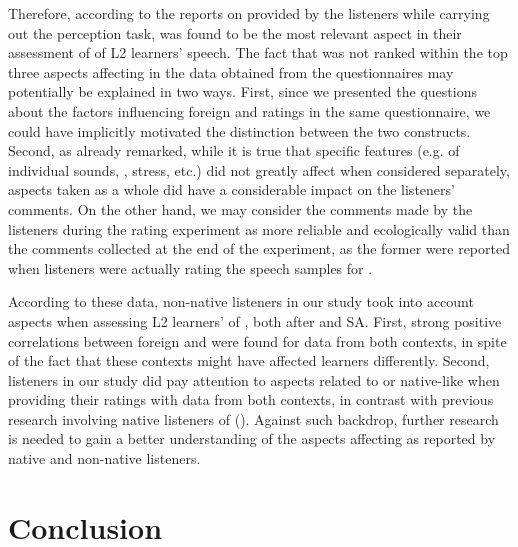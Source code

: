 \documentclass[output=paper]{langsci/langscibook}
\begin{document}
\largerpage
Therefore, according to the reports on  provided by the listeners while carrying out the perception task,  was found to be the most relevant aspect in their assessment of  of {L2} learners' speech.  The fact that  was not ranked within the top three aspects affecting  in the data obtained from the questionnaires may potentially be explained in two ways. First, since we presented the questions about the factors influencing foreign  and  ratings in the same questionnaire, we could have implicitly motivated the distinction between the two constructs. Second, as already remarked, while it is true that specific  features (e.g.  of individual sounds, , stress, etc.) did not greatly affect  when considered separately,  aspects taken as a whole did have a considerable impact on the listeners’ comments. On the other hand, we may consider the comments made by the listeners during the rating experiment as more reliable and ecologically valid than the comments collected at the end of the experiment, as the former were reported when listeners were actually rating the speech samples for . 

According to these data, non-native listeners in our study took into account  aspects when assessing {L2} learners’  of , both after  and SA. First, strong positive correlations between foreign  and  were found for data from both contexts, in spite of the fact that these contexts might have affected learners differently. Second, listeners in our study did pay attention to aspects related to  or native-like  when providing their  ratings with data from both contexts, in contrast with previous research involving native listeners of  (\citealt{TrofimovichIsaacs2012}). Against such backdrop, further research is needed to gain a better understanding of the aspects affecting  as reported by native and non-native listeners.


\section{Conclusion}
\end{document}
